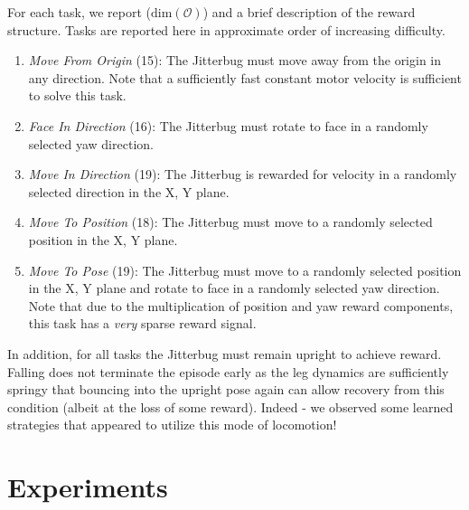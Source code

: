 \documentclass[letterpaper, 10 pt, conference]{ieeeconf}
\begin{document}
For each task, we report ($\text{dim}(\mathcal{O})$) and a brief description of the reward structure.
Tasks are reported here in approximate order of increasing difficulty.

\begin{enumerate}[topsep=8pt, partopsep=0pt]
    
    \item \emph{Move From Origin} (15): The Jitterbug must move away from the origin in any direction.
    Note that a sufficiently fast constant motor velocity is sufficient to solve this task.
    
    \item \emph{Face In Direction} (16): The Jitterbug must rotate to face in a randomly selected yaw direction.
    
    \item \emph{Move In Direction} (19): The Jitterbug is rewarded for velocity in a randomly selected direction in the X, Y plane.
    
    \item \emph{Move To Position} (18): The Jitterbug must move to a randomly selected position in the X, Y plane.
    
    \item \emph{Move To Pose} (19): The Jitterbug must move to a randomly selected position in the X, Y plane and rotate to face in a randomly selected yaw direction.
    Note that due to the multiplication of position and yaw reward components, this task has a \emph{very} sparse reward signal.
    
\end{enumerate}

In addition, for all tasks the Jitterbug must remain upright to achieve reward.
Falling does not terminate the episode early as the leg dynamics are sufficiently springy that bouncing into the upright pose again can allow recovery from this condition (albeit at the loss of some reward).
Indeed - we observed some learned strategies that appeared to utilize this mode of locomotion!

\section{Experiments}
\end{document}
